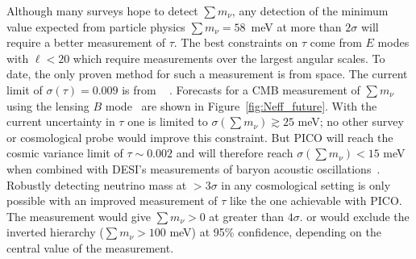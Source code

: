 \documentclass[PICOReport.tex]{subfiles}
\begin{document}
Although many surveys hope to detect $\sum m_\nu$, any detection 
of the minimum value expected from particle physics $\sum m_\nu = 58$~meV at more than $2 \sigma$ will 
require a better measurement of $\tau$.  The best constraints on $\tau$ come from $E$ modes with $\ell < 20$ which require 
measurements over the largest angular scales. To date, the only proven method for such a measurement is from space. 
The current limit of $\sigma({\tau}) = 0.009$ is from \planck~\cite{planck2016_xlvi} .  Forecasts for a
CMB measurement of $\sum m_\nu$ using the lensing $B$ mode~\cite{Kaplinghat:2003bh} are shown in 
Figure~\ref{fig:Neff_future}.  With the current uncertainty in $\tau$ one is limited to  
$\sigma(\sum m_\nu) \gtrsim 25$ meV; no other survey or cosmological probe would improve this constraint.  
But PICO will reach the cosmic variance limit of $\tau \sim 0.002$ and will therefore 
reach $\sigma(\sum m_\nu) < 15$ meV when combined with DESI's measurements of 
baryon acoustic oscillations~\cite{Levi:2013gra}.  Robustly detecting neutrino mass at  $> 3\sigma$ in any cosmological setting is 
only possible with an improved measurement of $\tau$ like the one achievable with PICO. The measurement
would give  $\sum m_\nu>0$ at greater than $4\sigma$.  or would exclude the inverted hierarchy ($\sum m_\nu > 100$ meV) at 95\% confidence, depending on the central value of the measurement. 
\end{document}
